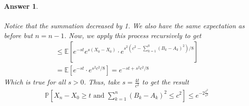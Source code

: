 \documentclass[12pt]{article}
\theoremstyle{colon}
\newtheorem*{answer}{Answer}
\begin{document}
\begin{answer}
\begin{enumerate}[label=\arabic*)]
\begin{gather*}
      \end{gather*}
      Notice that the summation decreased by 1. We also have the same expectation as before but $n = n-1$. Now, we apply this process recursively to get
      \begin{gather*}
        \leq \mathbb{E}[ e^{-st}e^{s(X_0-X_0)} \cdot e^{s^2(c^2 - \sum_{k=1}^{0} (B_k - A_k)^2)/8} ] \\
        = \mathbb{E}[ e^{-st} \cdot e^{s^2 c^2/8} ]
        = e^{-st + s^2 c^2/8}
      \end{gather*}
      Which is true for all $s > 0$. Thus, take $s = \frac{4t}{c^2}$ to get the result
      \begin{gather*}
        \mathbb{P} \left[ X_n - X_0 \geq t \text{ and } \sum_{k=1}^n (B_k - A_k)^2 \leq c^2 \right] \leq e^{-2 \frac{t^2}{c^2}}
      \end{gather*}


\end{enumerate}
\end{answer}
\end{document}
